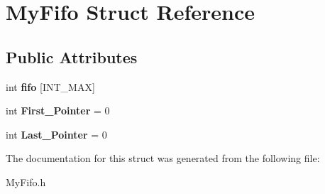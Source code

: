 \hypertarget{structMyFifo}{}\section{My\+Fifo Struct Reference}
\label{structMyFifo}
\subsection*{Public Attributes}
\begin{DoxyCompactItemize}
\item 
\mbox{\label{structMyFifo_aa768e4f00da0a3d4e018b463a09d30dc}} 
int {\bfseries fifo} \mbox{[}I\+N\+T\+\_\+\+M\+AX\mbox{]}
\item 
\mbox{\label{structMyFifo_a4d426f152ed91f03ad1601cfd7da35b0}} 
int {\bfseries First\+\_\+\+Pointer} = 0
\item 
\mbox{\label{structMyFifo_a1d2edc0e076e119a693819a4a35ce46d}} 
int {\bfseries Last\+\_\+\+Pointer} = 0
\end{DoxyCompactItemize}


The documentation for this struct was generated from the following file\+:\begin{DoxyCompactItemize}
\item 
My\+Fifo.\+h\end{DoxyCompactItemize}
